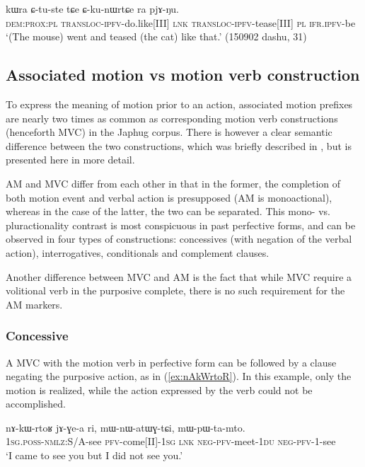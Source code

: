 \begin{exe}
\ex \label{ex:CkunWrtCe}
\gll  kɯra ɕ-tu-ste tɕe ɕ-ku-nɯrtɕe ra pjɤ-ŋu. \\
\textsc{dem}:\textsc{prox}:\textsc{pl} \textsc{transloc}-\textsc{ipfv}-do.like[III] \textsc{lnk}  \textsc{transloc}-\textsc{ipfv}-tease[III] \textsc{pl} \textsc{ifr}.\textsc{ipfv}-be \\
\glt `(The mouse) went and teased (the cat) like that.' (150902 dashu, 31)
\end{exe}

\subsection{Associated motion vs motion verb construction}
To express the meaning of motion prior to an action, associated motion prefixes are nearly two times as common as corresponding motion verb constructions (henceforth MVC) in the Japhug corpus. There is however a clear semantic difference between the two constructions, which was briefly described in \citet{jacques13harmonization}, but is presented here in more detail.

AM and MVC differ from each other in that in the former, the completion of both motion event and verbal action is presupposed (AM is monoactional), whereas in the case of the latter, the two can be separated. This mono- vs. pluractionality contrast is most conspicuous in past perfective forms, and can be observed in four types of constructions: concessives (with negation of the verbal action), interrogatives, conditionals and complement clauses. 

Another difference between MVC and AM is the fact that while MVC require a volitional verb in the purposive complete, there is no such requirement for the AM markers.

\subsubsection{Concessive} \label{sec:am.concessive}
A MVC  with the motion verb in perfective form can be followed by a clause negating the purposive action, as in (\ref{ex:nAkWrtoR}). In this example, only the motion is realized, while the action expressed by the verb  could not be accomplished.

\begin{exe}
\ex \label{ex:nAkWrtoR}
\gll nɤ-kɯ-rtoʁ jɤ-ɣe-a ri, mɯ-nɯ-atɯɣ-tɕi, mɯ-pɯ-ta-mto. \\
\textsc{1sg.poss}-\textsc{nmlz}:S/A-see \textsc{pfv}-come[II]-\textsc{1sg} \textsc{lnk} \textsc{neg}-\textsc{pfv}-meet-\textsc{1du} \textsc{neg}-\textsc{pfv}-1-see \\
\glt `I came to see you but I did not see you.' 
\end{exe}

